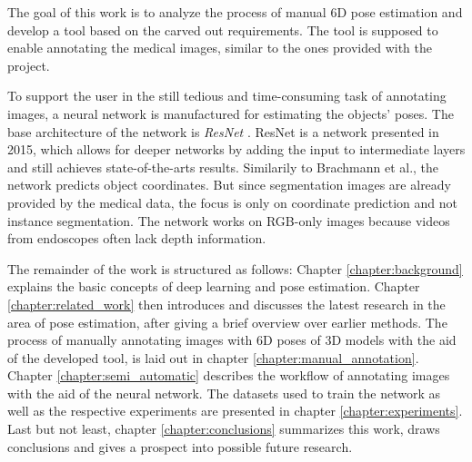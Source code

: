 The goal of this work is to analyze the process of manual 6D pose estimation and develop a tool based on the carved out requirements. The tool is supposed to enable annotating the medical images, similar to the ones provided with the project. 

To support the user in the still tedious and time-consuming task of annotating images, a neural network is manufactured for estimating the objects' poses. The base architecture of the network is \textit{ResNet} \cite{resnet}. ResNet is a network presented in 2015, which allows for deeper networks by adding the input to intermediate layers and still achieves state-of-the-arts results. Similarily to Brachmann et al., the network predicts object coordinates. But since segmentation images are already provided by the medical data, the focus is only on coordinate prediction and not instance segmentation. The network works on RGB-only images because videos from endoscopes often lack depth information. \

The remainder of the work is structured as follows: Chapter \ref{chapter:background} explains the basic concepts of deep learning and pose estimation. Chapter \ref{chapter:related_work} then introduces and discusses the latest research in the area of pose estimation, after giving a brief overview over earlier methods. The process of manually annotating images with 6D poses of 3D models with the aid of the developed tool, is laid out in chapter \ref{chapter:manual_annotation}. Chapter \ref{chapter:semi_automatic} describes the workflow of annotating images with the aid of the neural network. The datasets used to train the network as well as the respective experiments are presented in chapter \ref{chapter:experiments}. Last but not least, chapter \ref{chapter:conclusions} summarizes this work, draws conclusions and gives a prospect into possible future research.